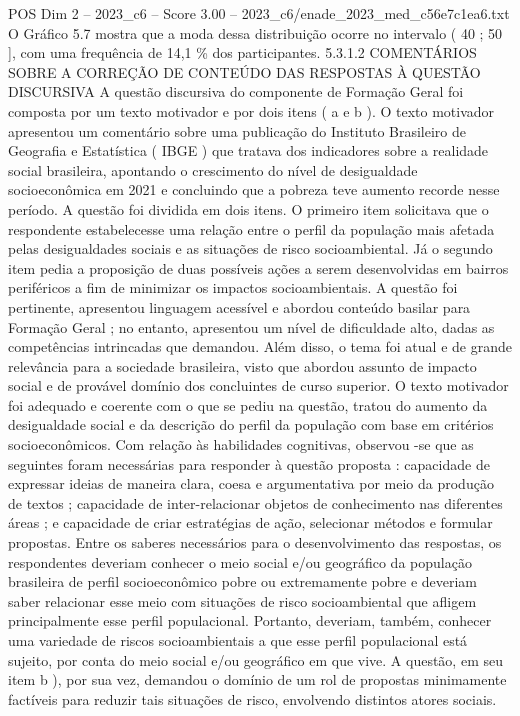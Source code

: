 \begin{textsample}{POS Dim 2 – 2023\_c6 – Score 3.00 – 2023\_c6/enade\_2023\_med\_c56e7c1ea6.txt}
O Gráfico 5.7 mostra que a moda dessa distribuição ocorre no intervalo ( 40 ; 50 ], com uma frequência de 14,1 \% dos participantes. 5.3.1.2 COMENTÁRIOS SOBRE A CORREÇÃO DE CONTEÚDO DAS RESPOSTAS À QUESTÃO DISCURSIVA A questão discursiva do componente de Formação Geral foi composta por um texto motivador e por dois itens ( a e b ).
O texto motivador apresentou um comentário sobre uma publicação do Instituto Brasileiro de Geografia e Estatística ( IBGE ) que tratava dos indicadores sobre a realidade social brasileira, apontando o crescimento do nível de desigualdade socioeconômica em 2021 e concluindo que a pobreza teve aumento recorde nesse período.
A questão foi dividida em dois itens.
O primeiro item solicitava que o respondente estabelecesse uma relação entre o perfil da população mais afetada pelas desigualdades sociais e as situações de risco socioambiental.
Já o segundo item pedia a proposição de duas possíveis ações a serem desenvolvidas em bairros periféricos a fim de minimizar os impactos socioambientais.
A questão foi pertinente, apresentou linguagem acessível e abordou conteúdo basilar para Formação Geral ; no entanto, apresentou um nível de dificuldade alto, dadas as competências intrincadas que demandou.
Além disso, o tema foi atual e de grande relevância para a sociedade brasileira, visto que abordou assunto de impacto social e de provável domínio dos concluintes de curso superior.
O texto motivador foi adequado e coerente com o que se pediu na questão, tratou do aumento da desigualdade social e da descrição do perfil da população com base em critérios socioeconômicos.
Com relação às habilidades cognitivas, observou -se que as seguintes foram necessárias para responder à questão proposta : capacidade de expressar ideias de maneira clara, coesa e argumentativa por meio da produção de textos ; capacidade de inter-relacionar objetos de conhecimento nas diferentes áreas ; e capacidade de criar estratégias de ação, selecionar métodos e formular propostas.
Entre os saberes necessários para o desenvolvimento das respostas, os respondentes deveriam conhecer o meio social e/ou geográfico da população brasileira de perfil socioeconômico pobre ou extremamente pobre e deveriam saber relacionar esse meio com situações de risco socioambiental que afligem principalmente esse perfil populacional.
Portanto, deveriam, também, conhecer uma variedade de riscos socioambientais a que esse perfil populacional está sujeito, por conta do meio social e/ou geográfico em que vive.
A questão, em seu item b ), por sua vez, demandou o domínio de um rol de propostas minimamente factíveis para reduzir tais situações de risco, envolvendo distintos atores sociais.

\end{textsample}

